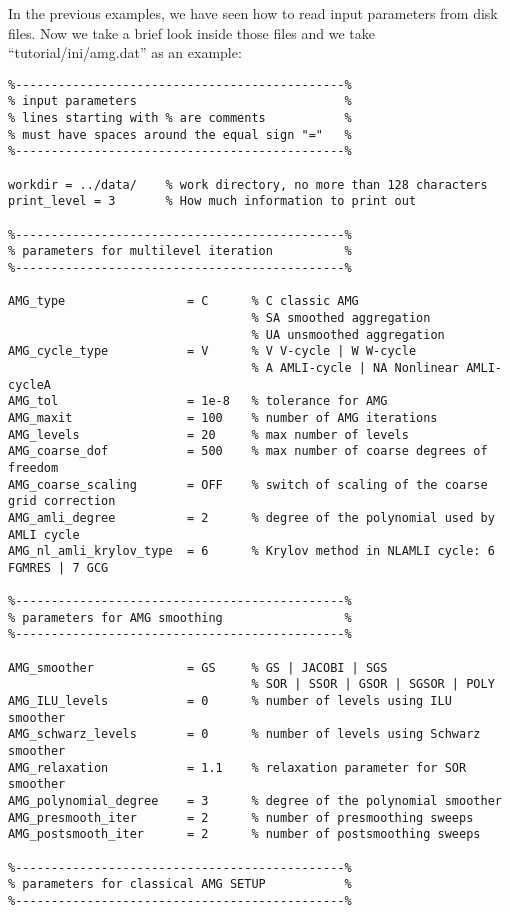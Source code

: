 \documentclass[11pt]{memoir}
\begin{document}
In the previous examples, we have seen how to read input parameters from disk files. Now we take a brief look inside those files and we take ``tutorial/ini/amg.dat'' as an example:
%
\begin{lstlisting}
%----------------------------------------------%
% input parameters                             %
% lines starting with % are comments           %
% must have spaces around the equal sign "="   %
%----------------------------------------------%

workdir = ../data/    % work directory, no more than 128 characters
print_level = 3       % How much information to print out 
 
%----------------------------------------------%
% parameters for multilevel iteration          %
%----------------------------------------------%

AMG_type                 = C      % C classic AMG
                                  % SA smoothed aggregation
                                  % UA unsmoothed aggregation
AMG_cycle_type           = V      % V V-cycle | W W-cycle
                                  % A AMLI-cycle | NA Nonlinear AMLI-cycleA
AMG_tol                  = 1e-8   % tolerance for AMG
AMG_maxit                = 100    % number of AMG iterations
AMG_levels               = 20     % max number of levels
AMG_coarse_dof           = 500    % max number of coarse degrees of freedom
AMG_coarse_scaling       = OFF    % switch of scaling of the coarse grid correction
AMG_amli_degree          = 2      % degree of the polynomial used by AMLI cycle
AMG_nl_amli_krylov_type  = 6      % Krylov method in NLAMLI cycle: 6 FGMRES | 7 GCG

%----------------------------------------------%
% parameters for AMG smoothing                 %
%----------------------------------------------%

AMG_smoother             = GS     % GS | JACOBI | SGS 
                                  % SOR | SSOR | GSOR | SGSOR | POLY
AMG_ILU_levels           = 0      % number of levels using ILU smoother
AMG_schwarz_levels       = 0      % number of levels using Schwarz smoother
AMG_relaxation           = 1.1    % relaxation parameter for SOR smoother 
AMG_polynomial_degree    = 3      % degree of the polynomial smoother
AMG_presmooth_iter       = 2      % number of presmoothing sweeps
AMG_postsmooth_iter      = 2      % number of postsmoothing sweeps

%----------------------------------------------%
% parameters for classical AMG SETUP           %
%----------------------------------------------%


\end{lstlisting}
\end{document}
